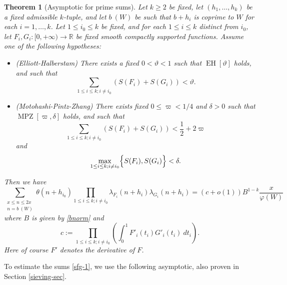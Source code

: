 \documentclass{bmcart}
\DeclareMathOperator*\EH{EH}
\DeclareMathOperator*\MPZ{MPZ}
\theoremstyle{plain}
\newtheorem{theorem}{Theorem}[section]
\theoremstyle{definition}
\newcommand\R{\mathbb{R}}
\renewcommand{\phi}{\varphi}
\begin{document}
\begin{theorem}[Asymptotic for prime sums]\label{prime-asym}  Let $k \geq 2$ be fixed, let $(h_1,\dots,h_k)$ be a fixed admissible $k$-tuple, and let $b\ (W)$ be such that $b+h_i$ is coprime to $W$ for each $i=1,\dots,k$.  Let $1 \leq i_0 \leq k$ be fixed, and for each $1 \leq i \leq k$ distinct from $i_0$, let $F_{i}, G_{i}: [0,+\infty) \to \R$ be fixed smooth compactly supported functions.  Assume one of the following hypotheses:
\begin{itemize}
\item[(i)]  (Elliott-Halberstam) There exists a fixed $0 < \vartheta < 1$ such that $\EH[\vartheta]$ holds, and such that
\begin{equation}\label{fg-upper}
\sum_{1 \leq i \leq k; i \neq i_0} ( S(F_{i}) + S(G_{i}) ) < \vartheta.
\end{equation}
\item[(ii)]  (Motohashi-Pintz-Zhang) There exists fixed $0 \leq \varpi < 1/4$ and $\delta > 0$ such that $\MPZ[\varpi,\delta]$ holds, and such that
\begin{equation}\label{fg-upper-alt}
\sum_{1 \leq i \leq k; i \neq i_0} ( S(F_{i}) + S(G_{i}) ) < \frac{1}{2} + 2 \varpi
\end{equation}
and
\begin{equation}
\max_{1 \leq i \leq k; i \neq i_0} \Bigl\{S(F_{i}), S(G_{i}) \Bigr\}< \delta.
\end{equation}
\end{itemize}
Then we have
\begin{equation}\label{theta-oo}
 \sum_{\substack{x \leq n \leq 2x\\ n = b\ (W)}} \theta(n+h_{i_0}) \prod_{1 \leq i \leq k; i \neq i_0} \lambda_{F_{i}}(n+h_{i}) \lambda_{G_{i}}(n+h_{i}) =
(c+o(1)) B^{1-k} \frac{x}{\phi(W)}
\end{equation}
where $B$ is given by \eqref{bnorm} and
$$ c := \prod_{1 \leq i \leq k; i \neq i_0} \left(\int_0^1 F'_i(t_{i}) G'_{i}(t_{i})\ dt_{i}\right).$$
Here of course $F'$ denotes the derivative of $F$.
\end{theorem}

To estimate the sums \eqref{sfg-1}, we use the following asymptotic, also proven in Section \ref{sieving-sec}.
\end{document}
